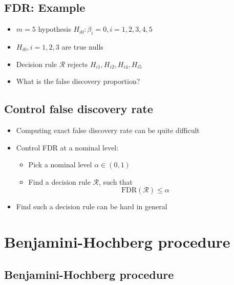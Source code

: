 \documentclass[]{article}
\begin{document}
\subsection{FDR: Example}\label{fdr-example}

\begin{itemize}
\item
  \(m=5\) hypothesis \(H_{i0}: \beta_i =0, i=1,2,3,4,5\)
\item
  \(H_{i0},i=1,2,3\) are true nulls
\item
  Decision rule \(\mathcal{R}\) rejects
  \(H_{i1}, H_{i2},H_{i4}, H_{i5}\)
\item
  What is the false discovery proportion?
\end{itemize}

\subsection{Control false discovery
rate}\label{control-false-discovery-rate}

\begin{itemize}
\item
  Computing exact false discovery rate can be quite difficult
\item
  Control FDR at a nominal level:

  \begin{itemize}
  \item
    Pick a nominal level \(\alpha \in (0,1)\)
  \item
    Find a decision rule \(\mathcal{R}\), such that
    \[ \mathrm{FDR}(\mathcal{R}) \le \alpha \]
  \end{itemize}
\item
  Find such a decision rule can be hard in general
\end{itemize}

\section{Benjamini-Hochberg
procedure}\label{benjamini-hochberg-procedure}

\subsection{Benjamini-Hochberg
procedure}\label{benjamini-hochberg-procedure-1}
\end{document}
